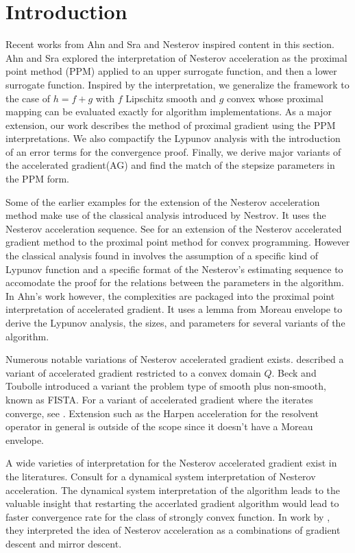 \documentclass[12pt]{article}
\begin{document}
\section{Introduction}
    Recent works from Ahn and Sra \cite{ahn_understanding_2022} and Nesterov \cite{nesterov_lectures_2018} inspired content in this section.
    Ahn and Sra explored the interpretation of Nesterov acceleration as the proximal point method (PPM) applied to an upper surrogate function, and then a lower surrogate function. 
    Inspired by the interpretation, we generalize the framework to the case of $h = f + g$ with $f$ Lipschitz smooth and $g$ convex whose proximal mapping can be evaluated exactly for algorithm implementations. 
    As a major extension, our work describes the method of proximal gradient using the PPM interpretations. We also compactify the Lypunov analysis with the introduction of an error terms for the convergence proof. Finally, we derive major variants of the accelerated gradient(AG) and find the match of the stepsize parameters in the PPM form. 
    \par
    Some of the earlier examples for the extension of the Nesterov acceleration method make use of the classical analysis introduced by Nestrov. 
    It uses the Nesterov acceleration sequence. 
    See \cite{guler_new_1992} for an extension of the Nesterov accelerated gradient method to the proximal point method for convex programming. 
    However the classical analysis found in \cite[chapter 2]{nesterov_lectures_2018} involves the assumption of a specific kind of Lypunov function and a specific format of the Nesterov's estimating sequence to accomodate the proof for the relations between the parameters in the algorithm. 
    In Ahn's work however, the complexities are packaged into the proximal point interpretation of accelerated gradient. 
    It uses a lemma from Moreau envelope to derive the Lypunov analysis, the sizes, and parameters for several variants of the algorithm. 
    \par
    Numerous notable variations of Nesterov accelerated gradient exists. \cite[(6.1.19)]{nesterov_lectures_2018} described a variant of accelerated gradient restricted to a convex domain $Q$. 
    Beck and Toubolle \cite{beck_fast_2009} introduced a variant the problem type of smooth plus non-smooth, known as FISTA. 
    For a variant of accelerated gradient where the iterates converge, see \cite{chambolle_convergence_2015}. 
    Extension such as the Harpen acceleration for the resolvent operator in general is outside of the scope since it doesn't have a Moreau envelope. 
    \par
    A wide varieties of interpretation for the Nesterov accelerated gradient exist in the literatures. 
    Consult \cite{su_differential_2015} for a dynamical system interpretation of Nesterov acceleration. 
    The dynamical system interpretation of the algorithm leads to the valuable insight that restarting the accerlated gradient algorithm would lead to faster convergence rate for the class of strongly convex function. 
    In work by \cite{allen-zhu_linear_2016}, they interpreted the idea of Nesterov acceleration as a combinations of gradient descent and mirror descent. 
\end{document}
